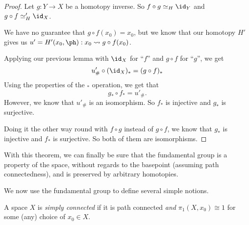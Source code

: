 \documentclass[a4paper]{article}
\begin{document}
\begin{proof}
  Let $g: Y\to X$ be a homotopy inverse. So $f\circ g\simeq_H \id_Y$ and $g\circ f\simeq_H' \id_X$.
  \begin{center}
  \end{center}
  We have no guarantee that $g\circ f(x_0) = x_0$, but we know that our homotopy $H'$ gives us $u' = H'(x_0, \ph): x_0 \leadsto g\circ f(x_0)$.

  Applying our previous lemma with $\id_X$ for ``$f$'' and $g \circ f$ for ``$g$'', we get
  \[
    u'_\# \circ (\id_X)_* = (g\circ f)_*
  \]
  Using the properties of the $_*$ operation, we get that
  \[
    g_*\circ f_* = u'_\#.
  \]
  However, we know that $u'_\#$ is an isomorphism. So $f_*$ is injective and $g_*$ is surjective.

  Doing it the other way round with $f\circ g$ instead of $g\circ f$, we know that $g_*$ is injective and $f_*$ is surjective. So both of them are isomorphisms.
\end{proof}
With this theorem, we can finally be sure that the fundamental group is a property of the space, without regards to the basepoint (assuming path connectedness), and is preserved by arbitrary homotopies.

We now use the fundamental group to define several simple notions.
\begin{defi}
  A space $X$ is \emph{simply connected} if it is path connected \emph{and} $\pi_1(X, x_0) \cong 1$ for some (any) choice of $x_0 \in X$.
\end{defi}
\end{document}

